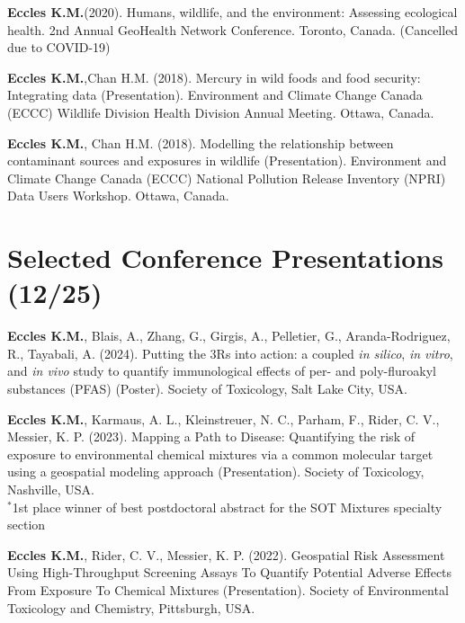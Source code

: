 \documentclass[margin,line]{res}
\begin{document}
\begin{resume}
\begin{etaremune}[start=9]
\item \textbf{Eccles K.M.}(2020). Humans, wildlife, and the environment: Assessing ecological health. 2nd Annual GeoHealth Network Conference. Toronto, Canada. (Cancelled due to COVID-19)

\item \textbf{Eccles K.M.},Chan H.M. (2018). Mercury in wild foods and food security: Integrating data (Presentation). Environment and Climate Change Canada (ECCC) Wildlife Division Health Division Annual Meeting. Ottawa, Canada.

\item \textbf{Eccles K.M.}, Chan H.M. (2018). Modelling the relationship between contaminant sources and exposures in wildlife (Presentation). Environment and Climate Change Canada (ECCC) National Pollution Release Inventory (NPRI) Data Users Workshop. Ottawa, Canada.
\end{etaremune}

\vspace*{.1in}
\section{\sc Selected Conference Presentations (12/25)}

\begin{etaremune}[start=12]

\item \textbf{Eccles K.M.}, Blais, A., Zhang, G., Girgis, A., Pelletier, G., Aranda-Rodriguez, R., Tayabali, A. (2024). Putting the 3Rs into action: a coupled \textit{in silico}, \textit{in vitro}, and \textit{in vivo} study to quantify immunological effects of per- and poly-fluroakyl substances (PFAS) (Poster). Society of Toxicology, Salt Lake City, USA.

\item \textbf{Eccles K.M.}, Karmaus, A. L., Kleinstreuer, N. C., Parham, F., Rider, C. V., Messier, K. P. (2023). Mapping a Path to Disease: Quantifying the risk of exposure to environmental chemical mixtures via a common molecular target using a geospatial modeling approach (Presentation). Society of Toxicology, Nashville, USA.\\
$^{*}$1st place winner of best postdoctoral abstract for the SOT Mixtures specialty section

\item \textbf{Eccles K.M.}, Rider, C. V., Messier, K. P. (2022). Geospatial Risk Assessment Using High-Throughput Screening Assays To Quantify Potential Adverse Effects From Exposure To Chemical Mixtures (Presentation). Society of Environmental Toxicology and Chemistry, Pittsburgh, USA.


\end{etaremune}
\end{resume}
\end{document}
